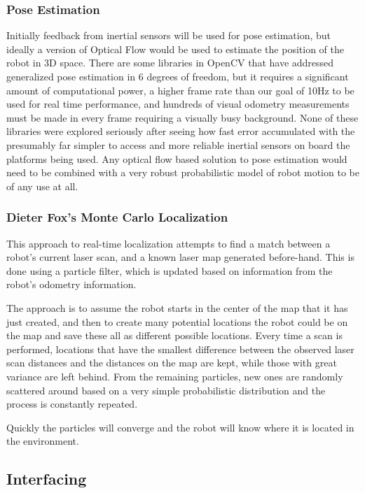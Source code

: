\documentclass{article}[12]
\begin{document}
		\subsubsection{Pose Estimation}
	
		Initially feedback from inertial sensors will be used for pose estimation, but ideally a version of Optical Flow would be used to estimate the position of the robot in 3D space. There are some libraries in OpenCV that have addressed generalized pose estimation in 6 degrees of freedom, but it requires a significant amount of computational power, a higher frame rate than our goal of 10Hz to be used for real time performance, and hundreds of visual odometry measurements must be made in every frame requiring a visually busy background. None of these libraries were explored seriously after seeing how fast error accumulated with the presumably far simpler to access and more reliable inertial sensors on board the platforms being used. Any optical flow based solution to pose estimation would need to be combined with a very robust probabilistic model of robot motion to be of any use at all.
		
		\subsubsection{Dieter Fox's Monte Carlo Localization}
		
		This approach to real-time localization attempts to find a match between a robot's current laser scan, and a known laser map generated before-hand. This is done using a particle filter, which is updated based on information from the robot's odometry information. 
		
		The approach is to assume the robot starts in the center of the map that it has just created, and then to create many potential locations the robot could be on the map and save these all as different possible locations. Every time a scan is performed, locations that have the smallest difference between the observed laser scan distances and the distances on the map are kept, while those with great variance are left behind. From the remaining particles, new ones are randomly scattered around based on a very simple probabilistic distribution and the process is constantly repeated. 
		
		Quickly the particles will converge and the robot will know where it is located in the environment.

	\subsection{Interfacing}
	
\end{document}
